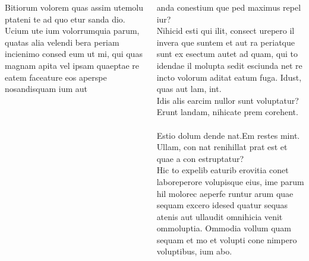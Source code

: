 \documentclass{beamer}
\begin{document}
\begin{frame}[t]
\begin{columns}[onlytextwidth]
\begin{column}{.49\linewidth}
      Bitiorum volorem quas assim utemolu ptateni te ad quo etur sanda
      dio. Ucium ute ium volorrumquia parum, quatas alia velendi bera
      periam incienimo consed eum ut mi, qui quas magnam apita vel
      ipsam quaeptae re eatem faceature eos aperspe nosandisquam ium
      aut
    \end{column}
    \begin{column}{.49\linewidth}
      anda conestium que ped maximus repel iur?\\[1ex]

      Nihicid esti qui ilit, consect urepero il invera que suntem et
      aut ra periatque sunt ex esectum autet ad quam, qui to idendae
      il molupta sedit esciunda net re incto volorum aditat eatum
      fuga. Idust, quas aut lam, int.\\[1ex]

      Idis alis earcim nullor sunt voluptatur? Erunt landam, nihicate
      prem corehent.\\[2ex]

      \\
      Estio dolum dende nat.Em restes mint.\\
      Ullam, con nat renihillat prat est et quae a con estruptatur?\\[1ex]

      Hic to expelib eaturib erovitia conet laboreperore volupisque
      eius, ime parum hil molorec aeperfe runtur arum quae sequam
      excero idesed quatur sequas atenis aut ullaudit omnihicia venit
      ommoluptia. Ommodia vollum quam sequam et mo et volupti cone
      nimpero voluptibus, ium abo.
    \end{column}
  \end{columns}
\end{frame}
\end{document}

